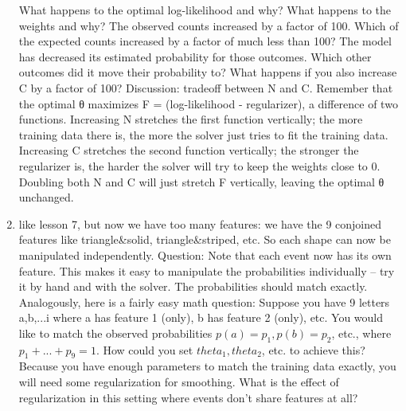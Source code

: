 \documentclass[11pt,letterpaper]{article}
\begin{document}
\begin{enumerate}
What happens to the optimal log-likelihood and why?
What happens to the weights and why?
The observed counts increased by a factor of 100. Which of the expected counts increased by a factor of much less than 100?
The model has decreased its estimated probability for those outcomes. Which other outcomes did it move their probability to?
What happens if you also increase C by a factor of 100?
Discussion: tradeoff between N and C. Remember that the optimal θ maximizes F = (log-likelihood - regularizer), a difference of two functions.
Increasing N stretches the first function vertically; the more training data there is, the more the solver just tries to fit the training data.
Increasing C stretches the second function vertically; the stronger the regularizer is, the harder the solver will try to keep the weights close to 0.
Doubling both N and C will just stretch F vertically, leaving the optimal θ unchanged.

\item %
like lesson 7, but now we have too many features: we have the 9 conjoined features like triangle\&solid, triangle\&striped, etc.  So each shape can now be manipulated independently.
Question:  Note that each event now has its own feature.  This makes it easy to manipulate the probabilities individually -- try it by hand and with the solver.  The probabilities should match exactly.  Analogously, here is a fairly easy math question: Suppose you have 9 letters a,b,...i where a has feature 1 (only), b has feature 2 (only), etc.  You would like to match the observed probabilities $p(a)=p_1, p(b)=p_2$, etc., where $p_1+...+p_9=1$.  How could you set $theta_1, theta_2$, etc. to achieve this?   Because you have enough parameters to match the training data exactly, you will need some regularization for smoothing.  What is the effect of regularization in this setting where events don’t share features at all? 
\end{enumerate}
\end{document}
